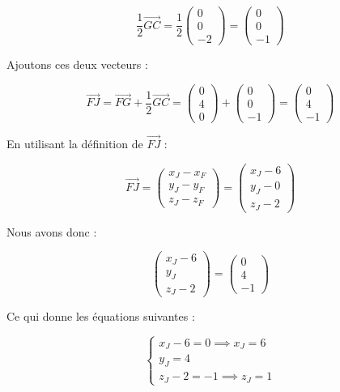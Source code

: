 \documentclass{exam}
\begin{document}
\begin{questions}
\[
\frac{1}{2} \overrightarrow{GC} = 
\frac{1}{2} \begin{pmatrix}
0 \\
0 \\
-2
\end{pmatrix}
=
\begin{pmatrix}
0 \\
0 \\
-1
\end{pmatrix}
\]

Ajoutons ces deux vecteurs :

\[
\overrightarrow{FJ} = 
\overrightarrow{FG} + \frac{1}{2} \overrightarrow{GC} =
\begin{pmatrix}
0 \\
4 \\
0
\end{pmatrix}
+
\begin{pmatrix}
0 \\
0 \\
-1
\end{pmatrix}
=
\begin{pmatrix}
0 \\
4 \\
-1
\end{pmatrix}
\]


En utilisant la définition de $\overrightarrow{FJ}$ :

\[
\overrightarrow{FJ} = 
\begin{pmatrix}
x_J - x_F \\
y_J - y_F \\
z_J - z_F
\end{pmatrix}
=
\begin{pmatrix}
x_J - 6 \\
y_J - 0 \\
z_J - 2
\end{pmatrix}
\]

Nous avons donc :

\[
\begin{pmatrix}
x_J - 6 \\
y_J \\
z_J - 2
\end{pmatrix}
=
\begin{pmatrix}
0 \\
4 \\
-1
\end{pmatrix}
\]

Ce qui donne les équations suivantes :

\[
\left\{
\begin{array}{l}
x_J - 6 = 0 \implies x_J = 6 \\
y_J = 4 \\
z_J - 2 = -1 \implies z_J = 1
\end{array}
\right.
\]


\end{questions}
\end{document}
